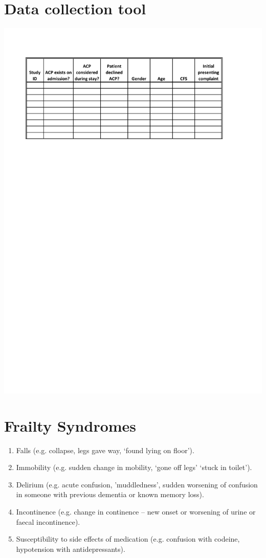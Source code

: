\documentclass
[
	12pt,
	a4paper,
	oneside,
]{report}
\begin{document}
\chapter{Data collection tool}
\label{apx:tool}
\includegraphics[width=\textwidth]{dataCollection}

\chapter{Frailty Syndromes}
	\label{apx:syndromes}
	\begin{enumerate}
	\item Falls (e.g. collapse, legs gave way, ‘found lying on floor’).
	\item Immobility (e.g. sudden change in mobility, ‘gone off legs’ ‘stuck in toilet’).
	\item Delirium (e.g. acute confusion, ’muddledness’,
		sudden worsening of confusion in someone with
		previous dementia or known memory loss).
	\item Incontinence (e.g. change in continence –
		new onset or worsening of urine or faecal
		incontinence).
	\item Susceptibility to side effects of medication
		(e.g. confusion with codeine, hypotension with
		antidepressants).
	\end{enumerate}
\end{document}
